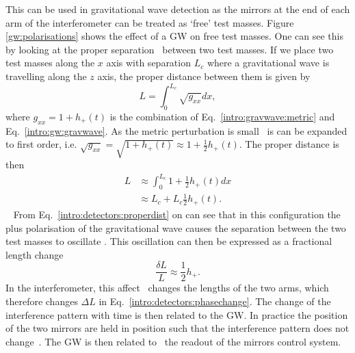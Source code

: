 This can be used in gravitational wave detection as the mirrors at the end of
each arm of the interferometer can be treated as `free' test masses.  Figure
\ref{gw:polarisations} shows the effect of a \gls{GW} on free test masses.  One
can see this by looking at the proper separation~ between two test masses.  If we
place two test masses along the $x$ axis with separation $L_c$ where a
gravitational wave is travelling along the $z$ axis, the proper distance
between them is given by
%
\begin{equation}
    L = \int_{0}^{L_c} \sqrt{g_{xx}} dx,
\end{equation}
%
where $g_{xx} = 1 + h_{+}(t)$ is the combination of
Eq.~\ref{intro:gravwave:metric} and Eq.~\ref{intro:gw:gravwave}.  As the metric
perturbation is small~ is can be expanded to first order, i.e.  $\sqrt{g_{xx}} = \sqrt{1 +
h_{+}(t)} \approx 1 + \frac{1}{2}h_{+}(t)$.  The proper distance is then
%
\begin{equation}
    \label{intro:detectors:properdist}
    \begin{split}
     L &\approx \int_{0}^{L_c} 1 + \frac{1}{2}h_{+}(t) dx \\
      &\approx L_c + L_c \frac{1}{2}h_{+}(t).
    \end{split}
\end{equation}
%
~ From
Eq.~\ref{intro:detectors:properdist} on can see that in this configuration the
plus polarisation of the gravitational wave causes the separation between the
two test masses to oscillate \citep{flanagan2005BasicsGravitational}.  This
oscillation can then be expressed as a fractional length change
%
\begin{equation}
    \label{intro:detectors:fraclength}
    \frac{\delta L}{L} \approx \frac{1}{2} h_{+}.
\end{equation}
%
In the interferometer, this affect~ changes the lengths of the
two arms, which therefore changes $\Delta L$ in
Eq.~\ref{intro:detectors:phasechange}.  The change of the interference pattern
with time is then related to the \gls{GW}.  In practice the position of the two
mirrors are held in position such that the interference pattern does not
change~.
The \gls{GW} is then related to~ the
readout of the mirrors control system.

